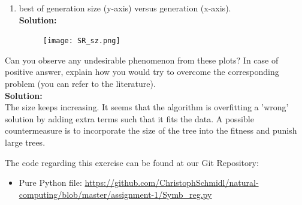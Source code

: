 \documentclass[a4paper]{article}
\begin{document}
\begin{enumerate}
\begin{enumerate}
	\item best of generation size (y-axis) versus generation (x-axis).\\
	\textbf{Solution:}\\
	\begin{figure}[ht!]
	\centering
  	\texttt{[image: SR\_sz.png]}
	\end{figure}
	
\end{enumerate}

Can you observe any undesirable phenomenon from these plots? In case of positive answer, explain how you would try to overcome the corresponding problem (you can refer to the literature).\\
\textbf{Solution:}\\
The size keeps increasing. It seems that the algorithm is overfitting a 'wrong' solution by adding extra terms such that it fits the data. A possible countermeasure is to incorporate the size of the tree into the fitness and punish large trees.

The code regarding this exercise can be found at our Git Repository:

\begin{itemize}
	\item Pure Python file: \url{https://github.com/ChristophSchmidl/natural-computing/blob/master/assignment-1/Symb_reg.py}
\end{itemize}	
		

\end{enumerate}
\end{document}
